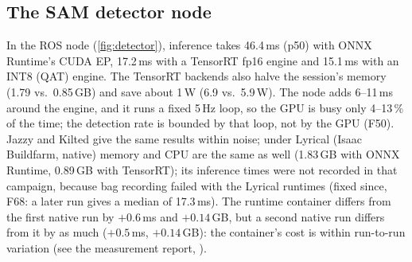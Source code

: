 \documentclass[11pt,a4paper]{article}
\newcommand{\finding}[1]{\textsf{\small F#1}}
\begin{document}
\subsection{The SAM detector node}
In the ROS node (\cref{fig:detector}), inference takes 46.4\,ms (p50) with ONNX Runtime's CUDA EP, 17.2\,ms with a
TensorRT fp16 engine and 15.1\,ms with an INT8 (QAT) engine. The TensorRT backends also halve the session's memory
(1.79 vs.\ 0.85\,GB) and save about 1\,W (6.9 vs.\ 5.9\,W). The node adds 6--11\,ms around the engine, and it runs a fixed
5\,Hz loop, so the GPU is busy only 4--13\,\% of the time; the detection rate is bounded by that loop, not by the GPU
(\finding{50}). Jazzy and Kilted give the same results within noise; under Lyrical (Isaac Buildfarm, native) memory and
CPU are the same as well (1.83\,GB with ONNX Runtime, 0.89\,GB with TensorRT); its inference times were not recorded in
that campaign, because bag recording failed with the Lyrical runtimes (fixed since, \finding{68}: a later run gives a
median of 17.3\,ms). The runtime container
differs from the first native run by $+0.6$\,ms and $+0.14$\,GB, but a second native run differs from it by as much
($+0.5$\,ms, $+0.14$\,GB): the container's cost is within run-to-run variation (see the measurement report,
).
\end{document}
